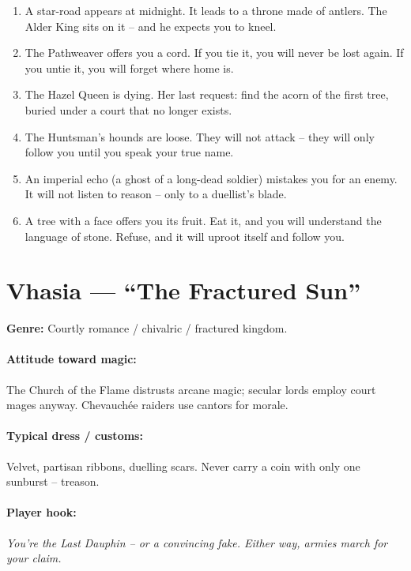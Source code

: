 \begin{tcolorbox}[colback=gray!5!white, colframe=gray!70!black, title=Valewood Mini-Generator (d6),breakable]
\begin{enumerate}
\item A star-road appears at midnight. It leads to a throne made of antlers. The Alder King sits on it -- and he expects you to kneel.
\item The Pathweaver offers you a cord. If you tie it, you will never be lost again. If you untie it, you will forget where home is.
\item The Hazel Queen is dying. Her last request: find the acorn of the first tree, buried under a court that no longer exists.
\item The Huntsman's hounds are loose. They will not attack -- they will only follow you until you speak your true name.
\item An imperial echo (a ghost of a long-dead soldier) mistakes you for an enemy. It will not listen to reason -- only to a duellist's blade.
\item A tree with a face offers you its fruit. Eat it, and you will understand the language of stone. Refuse, and it will uproot itself and follow you.
\end{enumerate}
\end{tcolorbox}

\section{Vhasia --- ``The Fractured Sun''}
\textbf{Genre:} Courtly romance / chivalric / fractured kingdom.

\paragraph{Attitude toward magic:} The Church of the Flame distrusts arcane magic; secular lords employ court mages anyway. Chevauchée raiders use cantors for morale.

\paragraph{Typical dress / customs:} Velvet, partisan ribbons, duelling scars. Never carry a coin with only one sunburst -- treason.

\paragraph{Player hook:} \emph{You're the Last Dauphin -- or a convincing fake. Either way, armies march for your claim.}

